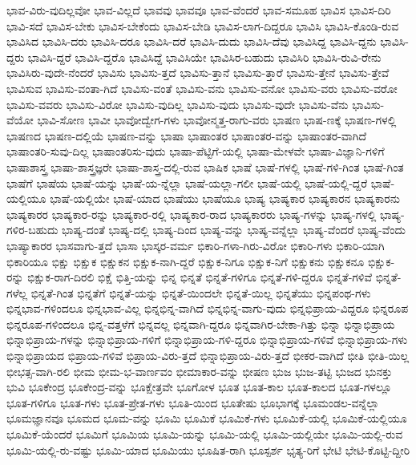 {ಭಾವ-ವಿರು-ವುದಿಲ್ಲವೋ
ಭಾವ-ವಿಲ್ಲದೆ
ಭಾವವು
ಭಾವವೂ
ಭಾವ-ವೆಂದರೆ
ಭಾವ-ಸಮೂಹ
ಭಾವಿಸ
ಭಾವಿಸ-ದಿರಿ
ಭಾವಿ-ಸದೆ
ಭಾವಿಸ-ಬೇಕು
ಭಾವಿಸ-ಬೇಕೆಂದು
ಭಾವಿಸ-ಬೇಡಿ
ಭಾವಿಸ-ಲಾಗ-ದಿದ್ದರೂ
ಭಾವಿಸಿ
ಭಾವಿಸಿ-ಕೊಂಡಿ-ರುವ
ಭಾವಿಸಿದ
ಭಾವಿಸಿ-ದರು
ಭಾವಿಸಿ-ದರೂ
ಭಾವಿಸಿ-ದರೆ
ಭಾವಿಸಿ-ದುದು
ಭಾವಿಸಿ-ದೆವು
ಭಾವಿಸಿದ್ದ
ಭಾವಿಸಿ-ದ್ದನು
ಭಾವಿಸಿ-ದ್ದರು
ಭಾವಿಸಿ-ದ್ದರೆ
ಭಾವಿಸಿ-ದ್ದರೊ
ಭಾವಿಸಿದ್ದೆ
ಭಾವಿಸಿಯೇ
ಭಾವಿಸಿರ-ಬಹುದು
ಭಾವಿಸಿರಿ
ಭಾವಿಸಿ-ರುವಿ-ರೇನು
ಭಾವಿಸಿರು-ವುದೇ-ನೆಂದರೆ
ಭಾವಿಸು
ಭಾವಿಸು-ತ್ತದೆ
ಭಾವಿಸು-ತ್ತಾನೆ
ಭಾವಿಸು-ತ್ತಾರೆ
ಭಾವಿಸು-ತ್ತೇನೆ
ಭಾವಿಸು-ತ್ತೇವೆ
ಭಾವಿಸುವ
ಭಾವಿಸು-ವಂತಾ-ಗಿದೆ
ಭಾವಿಸು-ವಂತೆ
ಭಾವಿಸು-ವನು
ಭಾವಿಸು-ವನೋ
ಭಾವಿಸು-ವರು
ಭಾವಿಸು-ವರೋ
ಭಾವಿಸು-ವವರು
ಭಾವಿಸು-ವಿರೋ
ಭಾವಿಸು-ವುದಿಲ್ಲ
ಭಾವಿಸು-ವುದು
ಭಾವಿಸು-ವುದೇ
ಭಾವಿಸು-ವೆನು
ಭಾವಿಸು-ವೆಯೋ
ಭಾವಿ-ಸೋಣ
ಭಾವೀ
ಭಾವೋದ್ವೇಗ-ಗಳು
ಭಾವೋನ್ಮತ್ತ-ರಾಗು-ವರು
ಭಾಷಣ
ಭಾಷ-ಣಕ್ಕೆ
ಭಾಷಣ-ಗಳಲ್ಲಿ
ಭಾಷಣದ
ಭಾಷಣ-ದಲ್ಲಿಯೆ
ಭಾಷಣ-ವನ್ನು
ಭಾಷಾ
ಭಾಷಾಂತರ
ಭಾಷಾಂತರ-ವನ್ನು
ಭಾಷಾಂತರ-ವಾಗಿದೆ
ಭಾಷಾಂತರಿ-ಸುವು-ದಿಲ್ಲ
ಭಾಷಾಂತರಿಸು-ವುದು
ಭಾಷಾ-ಪೆಟ್ಟಿಗೆ-ಯಲ್ಲಿ
ಭಾಷಾ-ಮೇಳವೇ
ಭಾಷಾ-ವಿಜ್ಞಾನಿ-ಗಳಿಗೆ
ಭಾಷಾಶಾಸ್ತ್ರ
ಭಾಷಾ-ಶಾಸ್ತ್ರಜ್ಞರೇ
ಭಾಷಾ-ಶಾಸ್ತ್ರ-ದಲ್ಲಿ-ರುವ
ಭಾಷಿಕ
ಭಾಷೆ
ಭಾಷೆ-ಗಳಲ್ಲಿ
ಭಾಷೆ-ಗಳಿ-ಗಿಂತ
ಭಾಷೆ-ಗಿಂತ
ಭಾಷೆಗೆ
ಭಾಷೆಯ
ಭಾಷೆ-ಯನ್ನು
ಭಾಷೆ-ಯ-ನ್ನೆಲ್ಲಾ
ಭಾಷೆ-ಯಲ್ಲಾ-ಗಲೀ
ಭಾಷೆ-ಯಲ್ಲಿ
ಭಾಷೆ-ಯಲ್ಲಿ-ದ್ದರೆ
ಭಾಷೆ-ಯಲ್ಲಿಯೂ
ಭಾಷೆ-ಯಲ್ಲಿಯೇ
ಭಾಷೆ-ಯಾದ
ಭಾಷೆಯು
ಭಾಷೆಯೂ
ಭಾಷ್ಯ
ಭಾಷ್ಯಕಾರ
ಭಾಷ್ಯಕಾರನ
ಭಾಷ್ಯಕಾರನು
ಭಾಷ್ಯಕಾರರ
ಭಾಷ್ಯಕಾರ-ರನ್ನು
ಭಾಷ್ಯಕಾರ-ರಲ್ಲಿ
ಭಾಷ್ಯಕಾರ-ರಾದ
ಭಾಷ್ಯಕಾರರು
ಭಾಷ್ಯ-ಗಳನ್ನು
ಭಾಷ್ಯ-ಗಳಲ್ಲಿ
ಭಾಷ್ಯ-ಗಳಿರ-ಬಹುದು
ಭಾಷ್ಯ-ದಂತೆ
ಭಾಷ್ಯ-ದಲ್ಲಿ
ಭಾಷ್ಯ-ದಿಂದ
ಭಾಷ್ಯ-ವನ್ನು
ಭಾಷ್ಯ-ವನ್ನೆಲ್ಲಾ
ಭಾಷ್ಯ-ವೆಂದರೆ
ಭಾಷ್ಯ-ವೆಂದು
ಭಾಷ್ಯಾಕಾರರ
ಭಾಸವಾಗು-ತ್ತದೆ
ಭಾಸಾ
ಭಾಸ್ಕರ-ವರ್ಮ
ಭಿಕಾರಿ-ಗಳಾ-ಗಿರು-ವಿರೋ
ಭಿಕಾರಿ-ಗಳು
ಭಿಕಾರಿ-ಯಾಗಿ
ಭಿಕಾರಿಯೂ
ಭಿಕ್ಷು
ಭಿಕ್ಷುಕ
ಭಿಕ್ಷುಕನ
ಭಿಕ್ಷುಕ-ನಾಗಿ-ದ್ದರೆ
ಭಿಕ್ಷುಕ-ನಿಗೂ
ಭಿಕ್ಷುಕ-ನಿಗೆ
ಭಿಕ್ಷುಕನು
ಭಿಕ್ಷುಕನೂ
ಭಿಕ್ಷುಕ-ರನ್ನು
ಭಿಕ್ಷುಕ-ರಾಗ-ದಿರಲಿ
ಭಿಕ್ಷೆ
ಭಿತ್ತಿ-ಯನ್ನು
ಭಿನ್ನ
ಭಿನ್ನತೆ
ಭಿನ್ನತೆ-ಗಳಿಗೂ
ಭಿನ್ನತೆ-ಗಳಿ-ದ್ದರೂ
ಭಿನ್ನತೆ-ಗಳಿವೆ
ಭಿನ್ನತೆ-ಗಳೆಲ್ಲ
ಭಿನ್ನತೆ-ಗಿಂತ
ಭಿನ್ನತೆಗೆ
ಭಿನ್ನತೆ-ಯನ್ನು
ಭಿನ್ನತೆ-ಯಿಂದಲೇ
ಭಿನ್ನತೆ-ಯಿಲ್ಲ
ಭಿನ್ನತೆಯು
ಭಿನ್ನಪಂಥ-ಗಳು
ಭಿನ್ನಭಾವ-ಗಳಿಂದಲೂ
ಭಿನ್ನಭಾವ-ವಿಲ್ಲ
ಭಿನ್ನಭಿನ್ನ-ವಾಗಿದೆ
ಭಿನ್ನಭಿನ್ನ-ವಾಗು-ವುದು
ಭಿನ್ನಭಿಪ್ರಾಯ-ವಿದ್ದರೂ
ಭಿನ್ನರೂಪ
ಭಿನ್ನರೂಪ-ಗಳಿಂದಲೂ
ಭಿನ್ನ-ವತ್ತಳೆಗೆ
ಭಿನ್ನವಲ್ಲ
ಭಿನ್ನವಾಗಿ-ದ್ದರೂ
ಭಿನ್ನವಾಗಿರ-ಬೇಕಾ-ಗಿತ್ತು
ಭಿನ್ನಾ
ಭಿನ್ನಾಭಿಪ್ರಾಯ
ಭಿನ್ನಾಭಿಪ್ರಾಯ-ಗಳನ್ನು
ಭಿನ್ನಾಭಿಪ್ರಾಯ-ಗಳಿಗೆ
ಭಿನ್ನಾಭಿಪ್ರಾಯ-ಗಳಿ-ದ್ದರೂ
ಭಿನ್ನಾಭಿಪ್ರಾಯ-ಗಳಿವೆ
ಭಿನ್ನಾಭಿಪ್ರಾಯ-ಗಳು
ಭಿನ್ನಾಭಿಪ್ರಾಯದ
ಭಿಪ್ರಾಯ-ಗಳಿವೆ
ಭಿಪ್ರಾಯ-ವಿರು-ತ್ತದೆ
ಭಿನ್ನಾಭಿಪ್ರಾಯ-ವಿರು-ತ್ತದೆ
ಭೀಕರ-ವಾಗಿದೆ
ಭೀತಿ
ಭೀತಿ-ಯಿಲ್ಲ
ಭೀಭತ್ಸ-ವಾಗಿ-ರಲಿ
ಭೀಮ
ಭೀಮ-ಭ-ವಾರ್ಣವಂ
ಭೀಮಾಕಾರ-ವನ್ನು
ಭೀಷಣ
ಭುಜ
ಭುಜ-ತಟ್ಟಿ
ಭುಜದ
ಭುನಕ್ತು
ಭುವಿ
ಭೂಕೇಂದ್ರ
ಭೂಕೇಂದ್ರ-ವನ್ನು
ಭೂಕ್ಷೇತ್ರವೇ
ಭೂಗೋಳ
ಭೂತ
ಭೂತ-ಕಾಲ
ಭೂತ-ಕಾಲದ
ಭೂತ-ಗಳಲ್ಲೂ
ಭೂತ-ಗಳಿಗೂ
ಭೂತ-ಗಳು
ಭೂತ-ಪ್ರೇತ-ಗಳು
ಭೂತಿ-ಯಿಂದ
ಭೂತೇಷು
ಭೂಭಾಗಕ್ಕೆ
ಭೂಮಂಡಲ-ವನ್ನೆಲ್ಲಾ
ಭೂಮಜ್ಞಾನವೂ
ಭೂಮದ
ಭೂಮ-ವನ್ನು
ಭೂಮಿ
ಭೂಮಿಕೆ
ಭೂಮಿಕೆ-ಗಳು
ಭೂಮಿಕೆ-ಯಲ್ಲಿ
ಭೂಮಿಕೆ-ಯಲ್ಲಿಯೂ
ಭೂಮಿಕೆ-ಯೆಂದರೆ
ಭೂಮಿಗೆ
ಭೂಮಿಯ
ಭೂಮಿ-ಯನ್ನು
ಭೂಮಿ-ಯಲ್ಲಿ
ಭೂಮಿ-ಯಲ್ಲಿಯೇ
ಭೂಮಿ-ಯಲ್ಲಿ-ರುವ
ಭೂಮಿ-ಯಲ್ಲಿ-ರು-ವಷ್ಟು
ಭೂಮಿ-ಯಾದ
ಭೂಮಿಯು
ಭೂಷಿತ-ರಾಗಿ
ಭೂಸ್ಪರ್ಶ
ಭೃತ್ಯ-ರಿಗೆ
ಭೇಟಿ
ಭೇಟಿ-ಕೊಟ್ಟಿ-ದ್ದೀರಿ
}
